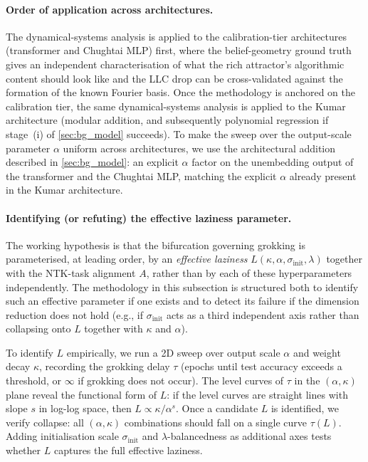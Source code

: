 \documentclass[11pt,a4paper]{article}
\begin{document}
\paragraph{Order of application across architectures.} The dynamical-systems analysis is applied to the calibration-tier architectures (transformer and Chughtai MLP) first, where the belief-geometry ground truth gives an independent characterisation of what the rich attractor's algorithmic content should look like and the LLC drop can be cross-validated against the formation of the known Fourier basis. Once the methodology is anchored on the calibration tier, the same dynamical-systems analysis is applied to the Kumar architecture (modular addition, and subsequently polynomial regression if stage~(i) of \cref{sec:bg_model} succeeds). To make the sweep over the output-scale parameter $\alpha$ uniform across architectures, we use the architectural addition described in \cref{sec:bg_model}: an explicit $\alpha$ factor on the unembedding output of the transformer and the Chughtai MLP, matching the explicit $\alpha$ already present in the Kumar architecture.

\paragraph{Identifying (or refuting) the effective laziness parameter.} The working hypothesis is that the bifurcation governing grokking is parameterised, at leading order, by an \emph{effective laziness} $L(\kappa, \alpha, \sigma_{\mathrm{init}}, \lambda)$ together with the NTK-task alignment $A$, rather than by each of these hyperparameters independently. The methodology in this subsection is structured both to identify such an effective parameter if one exists and to detect its failure if the dimension reduction does not hold (e.g., if $\sigma_{\mathrm{init}}$ acts as a third independent axis rather than collapsing onto $L$ together with $\kappa$ and $\alpha$).

To identify $L$ empirically, we run a 2D sweep over output scale $\alpha$ and weight decay $\kappa$, recording the grokking delay $\tau$ (epochs until test accuracy exceeds a threshold, or $\infty$ if grokking does not occur). The level curves of $\tau$ in the $(\alpha, \kappa)$ plane reveal the functional form of $L$: if the level curves are straight lines with slope $s$ in log-log space, then $L \propto \kappa / \alpha^s$. Once a candidate $L$ is identified, we verify collapse: all $(\alpha, \kappa)$ combinations should fall on a single curve $\tau(L)$. Adding initialisation scale $\sigma_{\mathrm{init}}$ and $\lambda$-balancedness as additional axes tests whether $L$ captures the full effective laziness.
\end{document}
